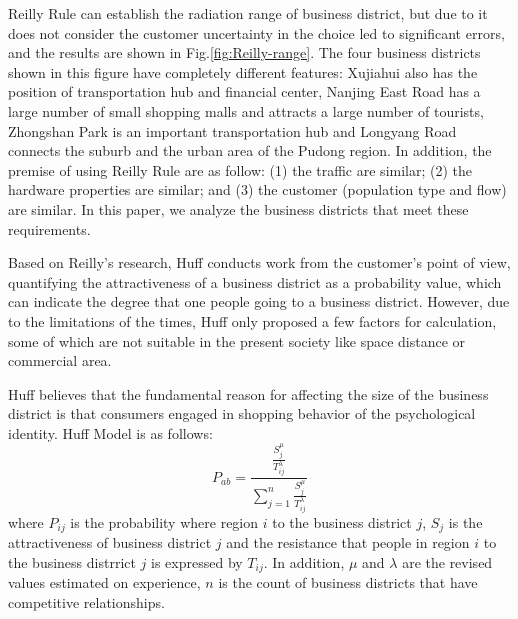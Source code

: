 \documentclass[journal,transmag]{IEEEtran}
\begin{document}
Reilly Rule can establish the radiation range of business district, but due to it does not consider the customer uncertainty in the choice led to significant errors, and the results are shown in Fig.\ref{fig:Reilly-range}. The four business districts shown in this figure have completely different features: Xujiahui also has the position of transportation hub and financial center, Nanjing East Road has a large number of small shopping malls and attracts a large number of tourists, Zhongshan Park is an important transportation hub and Longyang Road connects the suburb and the urban area of the Pudong region. In addition, the premise of using Reilly Rule are as follow: (1) the traffic are similar; (2) the hardware properties are similar; and (3) the customer (population type and flow) are similar. In this paper, we analyze the business districts that meet these requirements.

Based on Reilly's research, Huff conducts work from the customer's point of view, quantifying the attractiveness of a business district as a probability value, which can indicate the degree that one people going to a business district. However, due to the limitations of the times, Huff only proposed a few factors for calculation, some of which are not suitable in the present society like space distance or commercial area.

Huff believes that the fundamental reason for affecting the size of the business district is that consumers engaged in shopping behavior of the psychological identity. Huff Model is as follows:
\begin{equation}
P_{ab}=\frac{\frac{S_{j}^{\mu}}{T_{ij}^{\lambda}}}{\sum_{j=1}^{n}\frac{S_{j}^{\mu}}{T_{ij}^{\lambda}}}
\end{equation}
where $P_{ij}$ is the probability where region $i$ to the business district $j$, $S_{j}$ is the attractiveness of business district $j$ and the resistance that people in region $i$ to the business distrrict $j$ is expressed by $T_{ij}$. In addition, $\mu$ and $\lambda$ are the revised values estimated on experience, $n$ is the count of business districts that have competitive relationships.
\end{document}
